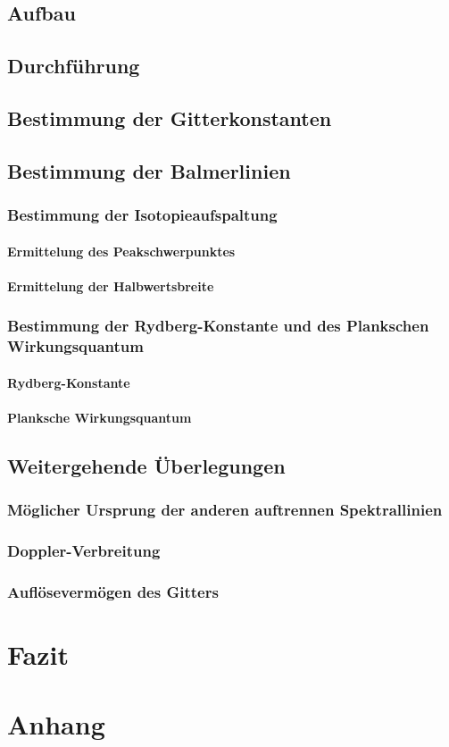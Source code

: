 \documentclass[ngerman]{scrartcl}
\begin{document}
\subsection{Aufbau}

\subsection{Durchführung}

\subsection{Bestimmung der Gitterkonstanten}

\subsection{Bestimmung der Balmerlinien}
\subsubsection{Bestimmung der Isotopieaufspaltung}
\paragraph{Ermittelung des Peakschwerpunktes}
\paragraph{Ermittelung der Halbwertsbreite}
\subsubsection{Bestimmung der Rydberg-Konstante und des Plankschen Wirkungsquantum}
\paragraph{Rydberg-Konstante}
\paragraph{Planksche Wirkungsquantum}

\subsection{Weitergehende Überlegungen}
\subsubsection{Möglicher Ursprung der anderen auftrennen Spektrallinien}
\subsubsection{Doppler-Verbreitung}
\subsubsection{Auflösevermögen des Gitters}
\clearpage
\section{Fazit}

\clearpage
\section{Anhang}
\end{document}
